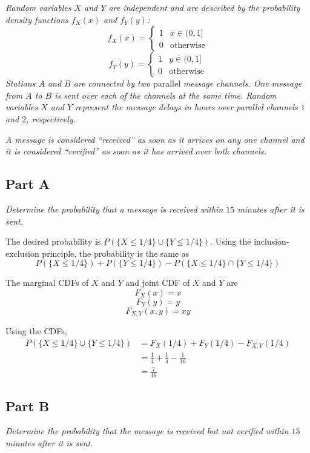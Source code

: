 \documentclass{article}
\begin{document}
\textit{Random variables $X$ and $Y$ are independent and are described by the
probability density functions $f_X(x)$ and $f_Y(y)$:}
$$ f_X(x) = \begin{cases}
    1 & x \in (0, 1] \\
    0 & \mathrm{otherwise}
\end{cases} $$
$$ f_Y(y) = \begin{cases}
    1 & y \in (0, 1] \\
    0 & \mathrm{otherwise}
\end{cases} $$
\textit{Stations $A$ and $B$ are connected by two} parallel \textit{message
channels. One message from $A$ to $B$ is sent over each of the channels at
the same time. Random variables $X$ and $Y$ represent the message delays in
hours over parallel channels $1$ and $2$, respectively.}

\textit{A message is considered ``received'' as soon as it arrives on any one
channel and it is considered ``verified'' as soon as it has arrived over both
channels.}

\subsection*{Part A}

\textit{Determine the probability that a message is received within $15$
minutes after it is sent.}

\bigbreak

The desired probability is $P(\{X \leq 1/4\} \cup \{Y \leq 1/4\})$. Using the
inclusion-exclusion principle, the probability is the same as
$$ P(\{X \leq 1/4\}) + P(\{Y \leq 1/4\}) - P(\{X \leq 1/4\} \cap \{Y \leq
1/4\}) $$

The marginal CDFs of $X$ and $Y$ and joint CDF of $X$ and $Y$ are
$$ F_X(x) = x $$
$$ F_Y(y) = y $$
$$ F_{X,Y}(x, y) = xy $$

Using the CDFs,
\begin{align*}
    P(\{X \leq 1/4\} \cup \{Y \leq 1/4\}) &= F_X(1/4) + F_Y(1/4) - F_{X,Y}(1/4) \\
    &= \frac{1}{4} + \frac{1}{4} - \frac{1}{16} \\
    &= \frac{7}{16} 
\end{align*}

\subsection*{Part B}

\textit{Determine the probability that the message is received but not
verified within $15$ minutes after it is sent.}
\end{document}
